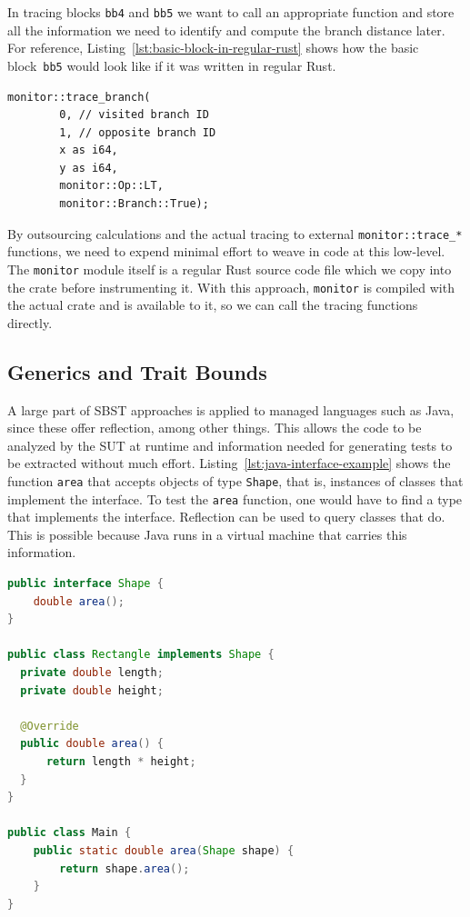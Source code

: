 \documentclass{article}
\begin{document}
In tracing blocks \lstinline{bb4} and \lstinline{bb5} we want to call an appropriate function and store all the information we need to identify and compute the branch distance later. For reference, Listing~\ref{lst:basic-block-in-regular-rust} shows how the basic block~\lstinline{bb5} would look like if it was written in regular Rust. 

\begin{lstlisting}[language={}, style=boxed, caption={How would \lstinline{bb5} look like in regular Rust code}, label=lst:basic-block-in-regular-rust]
monitor::trace_branch(
        0, // visited branch ID
        1, // opposite branch ID
        x as i64,
        y as i64, 
        monitor::Op::LT, 
        monitor::Branch::True);
\end{lstlisting}

By outsourcing calculations and the actual tracing to external \lstinline{monitor::trace_*} functions, we need to expend minimal effort to weave in code at this low-level. The \lstinline{monitor} module itself is a regular Rust source code file which we copy into the crate before instrumenting it. With this approach, \lstinline{monitor} is compiled with the actual crate and is available to it, so we can call the tracing functions directly.


\subsection{Generics and Trait Bounds}
A large part of SBST approaches is applied to managed languages such as Java, since these offer reflection, among other things. This allows the code to be analyzed by the SUT at runtime and information needed for generating tests to be extracted without much effort. Listing~\ref{lst:java-interface-example} shows the function \lstinline{area} that accepts objects of type \lstinline{Shape}, that is, instances of classes that implement the interface. To test the \lstinline{area} function, one would have to find a type that implements the interface. Reflection can be used to query classes that do. This is possible because Java runs in a virtual machine that carries this information.

\begin{lstlisting}[language=Java, style=boxed, caption={A function that takes objects implementing an interface}, label=lst:java-interface-example]
public interface Shape {
    double area();
}

public class Rectangle implements Shape {
  private double length;
  private double height;

  @Override
  public double area() {
      return length * height;
  }
}

public class Main {
    public static double area(Shape shape) {
        return shape.area();
    } 
}
\end{lstlisting}
\end{document}
